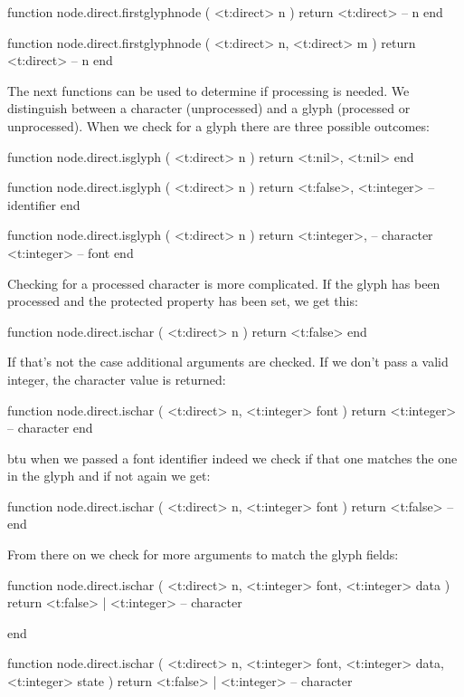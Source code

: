 \starttyping[option=LUA]
function node.direct.firstglyphnode ( <t:direct> n )
    return <t:direct> -- n
end

function node.direct.firstglyphnode ( <t:direct> n, <t:direct> m )
    return <t:direct> -- n
end
\stoptyping

The next functions can be used to determine if processing is needed. We distinguish between
a character (unprocessed) and a glyph (processed or unprocessed). When we check for a glyph
there are three possible outcomes:

\starttyping[option=LUA]
function node.direct.isglyph ( <t:direct> n )
    return
        <t:nil>,
        <t:nil>
end

function node.direct.isglyph ( <t:direct> n )
    return
        <t:false>,
        <t:integer> -- identifier
end

function node.direct.isglyph ( <t:direct> n )
    return
        <t:integer>, -- character
        <t:integer>  -- font
end
\stoptyping

Checking for a processed character is more complicated. If the glyph has been processed and
the protected property has been set, we get this:

\starttyping[option=LUA]
function node.direct.ischar ( <t:direct> n )
    return <t:false>
end
\stoptyping

If that's not the case additional arguments are checked. If we don't pass a valid
integer, the character value is returned:

\starttyping[option=LUA]
function node.direct.ischar ( <t:direct> n, <t:integer> font )
    return <t:integer> -- character
end
\stoptyping

btu when we passed a font identifier indeed we check if that one matches the one in the
glyph and if not again we get:

\starttyping[option=LUA]
function node.direct.ischar ( <t:direct> n, <t:integer> font )
    return <t:false> --
end
\stoptyping

From there on we check for more arguments to match the glyph fields:

\starttyping[option=LUA]
function node.direct.ischar (
    <t:direct>  n,
    <t:integer> font,
    <t:integer> data
)
    return <t:false> | <t:integer> -- character

end

function node.direct.ischar (
    <t:direct>  n,
    <t:integer> font,
    <t:integer> data,
    <t:integer> state
)
    return <t:false> | <t:integer> -- character

